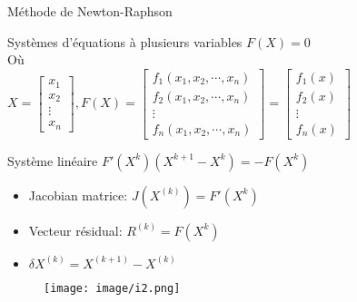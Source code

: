 \documentclass[11pt]{beamer}
\begin{document}
\begin{frame}{Méthode de Newton-Raphson}
\begin{block}{Systèmes d'équations à plusieurs variables}
$F(X) = 0$
\\
Où
\\
$X =
\begin{bmatrix}
x_1
\\
x_2
\\
\vdots
\\
x_n
\end{bmatrix} ,
F(X) =
\begin{bmatrix}
f_1(x_1, x_2, \cdots, x_n)
\\
f_2(x_1, x_2, \cdots, x_n)
\\
\vdots
\\
f_n(x_1, x_2, \cdots, x_n)
\end{bmatrix} =
\begin{bmatrix}
f_1(x)
\\
f_2(x)
\\
\vdots
\\
f_n(x)
\end{bmatrix}$
 \end{block}
 
 
\begin{block}{Système linéaire}
$ F'(X^k) (X^{k+1} - X^k) = -F(X^k)$
 
\end{block}
 


\begin{itemize}
\item Jacobian matrice: $J(X^{(k)}) = F'(X^k)$

\item Vecteur résidual: $ R^{(k)} = F(X^k)$

\item $ \delta X^{(k)} = X^{(k+1)} - X^{(k)}  $
\end{itemize}
 
\end{frame}




\begin{frame}

\begin{figure}
\texttt{[image: image/i2.png]}
\end{figure}

\end{frame}
\end{document}
